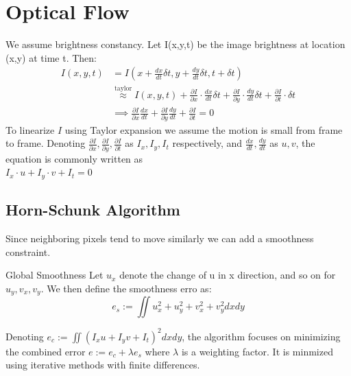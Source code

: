 \documentclass[a4paper,9pt]{article}
\begin{document}
\section{Optical Flow}
We assume brightness constancy. Let I(x,y,t) be the image brightness at location (x,y) at time t. Then:
\begin{align*}
I(x,y,t)&=I(x+\frac{dx}{dt}\delta t , y+\frac{dy}{dt}\delta t ,t+\delta t)\\
&\overset{\text{taylor}}{\approx} I(x, y, t) + \frac{\partial I}{\partial x} \cdot \frac{dx}{dt}\delta t + \frac{\partial I}{\partial y} \cdot \frac{dy}{dt}\delta t + \frac{\partial I}{\partial t} \cdot \delta t\\
&\implies \frac{\partial I}{\partial x}\frac{dx}{dt} + \frac{\partial I}{\partial y}\frac{dy}{dt} + \frac{\partial I}{\partial t} = 0
\end{align*}
To linearize $I$ using Taylor expansion we assume the motion is small from frame to frame.
Denoting $\frac{\partial I}{\partial x}, \frac{\partial I}{\partial y}, \frac{\partial I}{\partial t}$ as $I_x, I_y, I_t$ respectively, and $\frac{dx}{dt}, \frac{dy}{dt}$ as $u, v$, the equation is commonly written as\\
$I_x \cdot u + I_y \cdot v + I_t = 0$
\subsection{Horn-Schunk Algorithm}
Since neighboring pixels tend to move similarly we can add a smoothness constraint. 
\begin{mainbox}{Global Smoothness}
Let $u_x$
denote the change of u in x direction, and so on for $u_y, v_x, v_y$. We then define the smoothness erro as:
$$e_s:=\iint u_x^2+u_y^2+v_x^2+v_y^2dxdy$$
\end{mainbox}
Denoting $e_c:=\iint (I_xu+I_yv+I_t)^2dxdy$, the algorithm focuses on minimizing the combined error $e:=e_c+\lambda e_s$ where $\lambda$ is a weighting factor.
It is minmized using iterative methods with finite differences.
\end{document}
